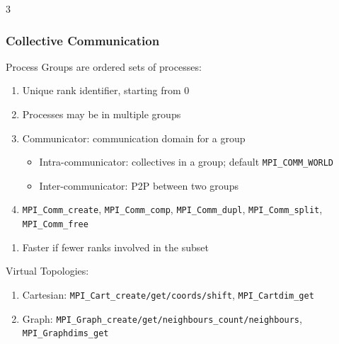 \documentclass[12pt, a4paper]{article}
\begin{document}
\begin{multicols*}{3}
\colbreak
\subsubsection{Collective Communication}

Process Groups are ordered sets of processes:
\begin{enumerate}[\roman*.]
  \item Unique rank identifier, starting from 0 
  \item Processes may be in multiple groups
  \item Communicator: communication domain for a group
    \begin{itemize}[leftmargin=*]\vspace{2pt}
      \item Intra-communicator: collectives in a group; default \lstinline|MPI_COMM_WORLD|
      \item Inter-communicator: P2P between two groups
    \end{itemize}
  \item \lstinline|MPI_Comm_create|, \lstinline|MPI_Comm_comp|, \lstinline|MPI_Comm_dupl|, \lstinline|MPI_Comm_split|, \lstinline|MPI_Comm_free|
\end{enumerate}
\begin{enumerate}[$+$]
  \item Faster if fewer ranks involved in the subset 
\end{enumerate}
{
\lstset{basicstyle=\ttfamily\scriptsize}
Virtual Topologies: 
\begin{enumerate}[\roman*.]
  \item Cartesian: \lstinline|MPI_Cart_create/get/coords/shift|, \lstinline|MPI_Cartdim_get| 
  \item Graph: \lstinline|MPI_Graph_create/get/neighbours_count/neighbours|, \lstinline|MPI_Graphdims_get|
\end{enumerate}

}
\end{multicols*}
\end{document}
